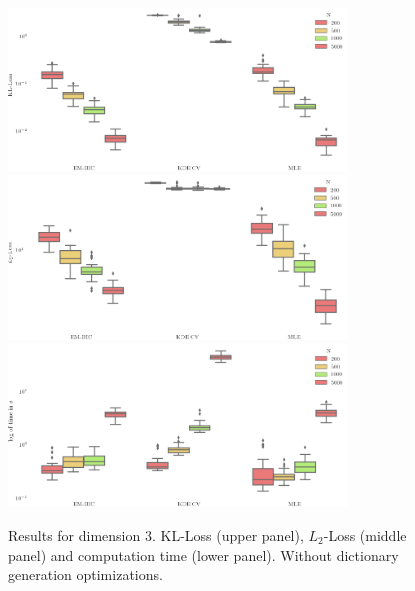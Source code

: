 \begin{figure}
\center
    \includegraphics[width=0.8\textwidth]{./TeX_files/dict_gen_loss_dim_3_KL.png}
    \includegraphics[width=0.8\textwidth]{./TeX_files/dict_gen_loss_dim_3_L2.png}
    \includegraphics[width=0.8\textwidth]{./TeX_files/dict_gen_time_dim_3.png}
    \caption{Results for dimension 3. KL-Loss (upper panel), $L_2$-Loss (middle panel) and computation time (lower panel). Without dictionary generation optimizations.}
    \label{fig:result_dict_gen_dim_3}
\end{figure}
